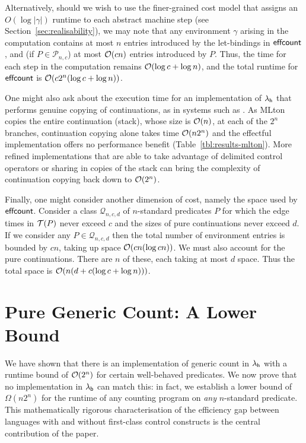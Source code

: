 \documentclass[12pt,phd,lfcs,twoside,openright,logo,leftchapter,normalheadings]{infthesis}
\theoremstyle{plain}
\theoremstyle{definition}
\begin{document}
Alternatively, should we wish to use the finer-grained cost model that
assigns an $O(\log |\gamma|)$ runtime to each abstract machine step
(see Section~\ref{sec:realisability}), we may note that any
environment $\gamma$ arising in the computation contains at most $n$
entries introduced by the let-bindings in $\mathsf{effcount}$, and (if $P \in
\mathcal{P}_{n,c}$) at most $\mathcal{O}(cn)$ entries introduced by $P$.
Thus, the time for each step in the computation remains $\mathcal{O}(\log c
+ \log n)$, and the total runtime for $\mathsf{effcount}$ is $\mathcal{O}(c 2^n (\log
c + \log n))$.

One might also ask about the execution time for an implementation of
$\lambda_{\mathsf{h}}$ that performs genuine copying of continuations, as in systems
such as \citet{mlton}.
%
As MLton copies the entire continuation (stack), whose size is
$\mathcal{O}(n)$, at each of the $2^n$ branches, continuation copying alone
takes time $\mathcal{O}(n2^n)$ and the effectful implementation offers no
performance benefit (Table~\ref{tbl:results-mlton}).
%
More refined implementations \citep{FarvardinR20, FlattD20} that are
able to take advantage of delimited control operators or sharing in
copies of the stack can bring the complexity of continuation copying
back down to $\mathcal{O}(2^n)$.

Finally, one might consider another dimension of cost, namely the
space used by $\mathsf{effcount}$.
%
Consider a class $\mathcal{Q}_{n,c,d}$ of $n$-standard predicates $P$
for which the edge times in $\mathcal{T}(P)$ never exceed $c$ and the sizes of
pure continuations never exceed $d$.
%
If we consider any $P \in \mathcal{Q}_{n,c,d}$ then the total number
of environment entries is bounded by $cn$, taking up space
$\mathcal{O}(cn(\log cn))$.
%
We must also account for the pure continuations. There are $n$ of
these, each taking at most $d$ space.
%
Thus the total space is $\mathcal{O}(n(d + c(\log c + \log n)))$.

\section{Pure Generic Count: A Lower Bound}
\label{sec:pure-counting}

\newcommand{\naivecount}{\dec{naivecount}}
\newcommand{\lazycount}{\dec{lazycount}}
\newcommand{\BergerCount}{\dec{BergerCount}}
\newcommand{\bestshot}{\dec{bestshot}}
\newcommand{\FF}{\mathcal{F}}
\newcommand{\GG}{\mathcal{G}}

We have shown that there is an implementation of generic count in
$\lambda_{\mathsf{h}}$ with a runtime bound of $\mathcal{O}(2^n)$ for certain well-behaved
predicates. We now prove that no implementation in $\lambda_{\mathsf{b}}$ can match
this: in fact, we establish a lower bound of $\Omega(n2^n)$ for the
runtime of any counting program on \emph{any} $n$-standard predicate.
This mathematically rigorous characterisation of the efficiency gap
between languages with and without first-class control constructs is
the central contribution of the paper.
\end{document}
